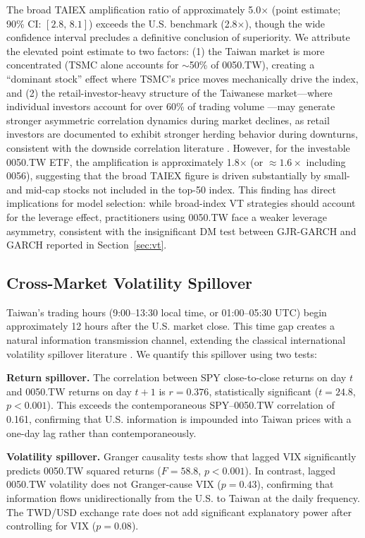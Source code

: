 The broad TAIEX amplification ratio of approximately 5.0$\times$ (point estimate; 90\% CI: $[2.8, \, 8.1]$) exceeds the U.S. benchmark (2.8$\times$), though the wide confidence interval precludes a definitive conclusion of superiority. We attribute the elevated point estimate to two factors: (1) the Taiwan market is more concentrated (TSMC alone accounts for $\sim$50\% of 0050.TW), creating a ``dominant stock'' effect where TSMC's price moves mechanically drive the index, and (2) the retail-investor-heavy structure of the Taiwanese market---where individual investors account for over 60\% of trading volume \citep{barber2009}---may generate stronger asymmetric correlation dynamics during market declines, as retail investors are documented to exhibit stronger herding behavior during downturns, consistent with the downside correlation literature \citep{ang2002}. However, for the investable 0050.TW ETF, the amplification is approximately 1.8$\times$ (or $\approx 1.6\times$ including 0056), suggesting that the broad TAIEX figure is driven substantially by small- and mid-cap stocks not included in the top-50 index. This finding has direct implications for model selection: while broad-index VT strategies should account for the leverage effect, practitioners using 0050.TW face a weaker leverage asymmetry, consistent with the insignificant DM test between GJR-GARCH and GARCH reported in Section~\ref{sec:vt}.

\subsection{Cross-Market Volatility Spillover}
\label{sec:spillover}

Taiwan's trading hours (9:00--13:30 local time, or 01:00--05:30 UTC) begin approximately 12 hours after the U.S. market close. This time gap creates a natural information transmission channel, extending the classical international volatility spillover literature \citep{hamao1990,lin1994}. We quantify this spillover using two tests:

\textbf{Return spillover.} The correlation between SPY close-to-close returns on day $t$ and 0050.TW returns on day $t+1$ is $r = 0.376$, statistically significant ($t = 24.8$, $p < 0.001$). This exceeds the contemporaneous SPY--0050.TW correlation of 0.161, confirming that U.S. information is impounded into Taiwan prices with a one-day lag rather than contemporaneously.

\textbf{Volatility spillover.} Granger causality tests show that lagged VIX significantly predicts 0050.TW squared returns ($F = 58.8$, $p < 0.001$). In contrast, lagged 0050.TW volatility does not Granger-cause VIX ($p = 0.43$), confirming that information flows unidirectionally from the U.S. to Taiwan at the daily frequency. The TWD/USD exchange rate does not add significant explanatory power after controlling for VIX ($p = 0.08$).

